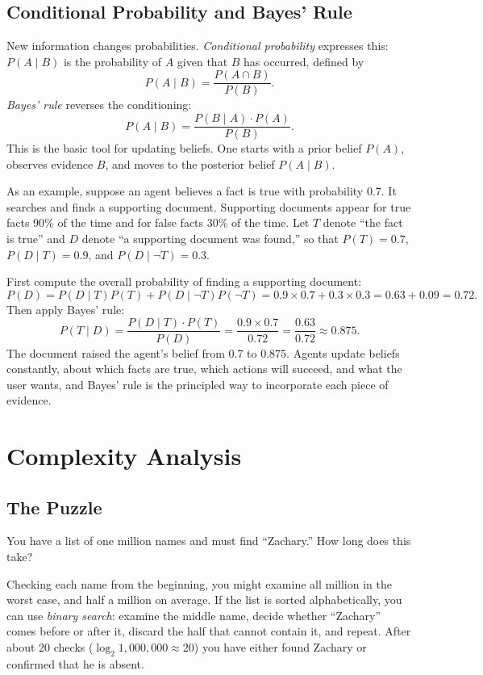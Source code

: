 \documentclass[11pt]{book}
\begin{document}
\subsection{Conditional Probability and Bayes' Rule}

New information changes probabilities. \emph{Conditional probability} expresses this: $P(A \mid B)$ is the probability of $A$ given that $B$ has occurred, defined by
\[
P(A \mid B) = \frac{P(A \cap B)}{P(B)}.
\]
\emph{Bayes' rule} reverses the conditioning:
\[
P(A \mid B) = \frac{P(B \mid A) \cdot P(A)}{P(B)}.
\]
This is the basic tool for updating beliefs. One starts with a prior belief $P(A)$, observes evidence $B$, and moves to the posterior belief $P(A \mid B)$.

As an example, suppose an agent believes a fact is true with probability 0.7. It searches and finds a supporting document. Supporting documents appear for true facts 90\% of the time and for false facts 30\% of the time. Let $T$ denote ``the fact is true'' and $D$ denote ``a supporting document was found,'' so that $P(T) = 0.7$, $P(D \mid T) = 0.9$, and $P(D \mid \neg T) = 0.3$.

First compute the overall probability of finding a supporting document:
\[
P(D) = P(D \mid T)P(T) + P(D \mid \neg T)P(\neg T) = 0.9 \times 0.7 + 0.3 \times 0.3 = 0.63 + 0.09 = 0.72.
\]
Then apply Bayes' rule:
\[
P(T \mid D) = \frac{P(D \mid T) \cdot P(T)}{P(D)} = \frac{0.9 \times 0.7}{0.72} = \frac{0.63}{0.72} \approx 0.875.
\]
The document raised the agent's belief from 0.7 to 0.875. Agents update beliefs constantly, about which facts are true, which actions will succeed, and what the user wants, and Bayes' rule is the principled way to incorporate each piece of evidence.

\section{Complexity Analysis}

\subsection{The Puzzle}

You have a list of one million names and must find ``Zachary.'' How long does this take?

Checking each name from the beginning, you might examine all million in the worst case, and half a million on average. If the list is sorted alphabetically, you can use \emph{binary search}: examine the middle name, decide whether ``Zachary'' comes before or after it, discard the half that cannot contain it, and repeat. After about 20 checks ($\log_2 1{,}000{,}000 \approx 20$) you have either found Zachary or confirmed that he is absent.
\end{document}
